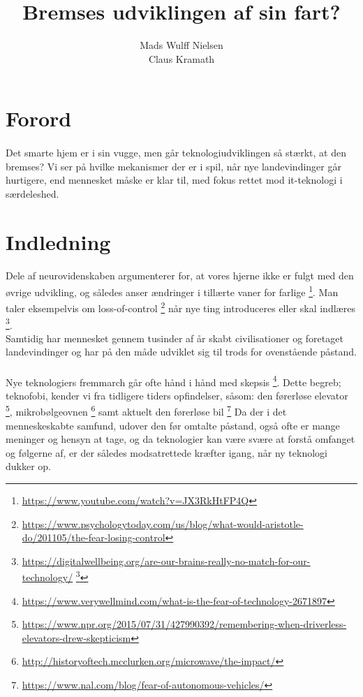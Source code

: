 \documentclass{article}
\title{%
Bremses udviklingen af sin fart?
}
\author{Mads Wulff Nielsen \\
Claus Kramath}
\begin{document}
\maketitle
\thispagestyle{empty}
\newpage
\tableofcontents
\thispagestyle{empty} 
\newpage
\section{Forord}
\paragraph{}
Det smarte hjem er i sin vugge, men går teknologiudviklingen så
stærkt, at den bremses? Vi ser på hvilke mekanismer der er i spil, når nye
landevindinger går hurtigere, end mennesket måske er klar til, med fokus
rettet mod it-teknologi i særdeleshed.
\section{Indledning}
\paragraph{}
Dele af neurovidenskaben argumenterer for, at vores hjerne ikke er fulgt med den øvrige udvikling,
og således anser ændringer i tillærte vaner for farlige \footnote{\url{https://www.youtube.com/watch?v=JX3RkHtFP4Q}}. Man taler eksempelvis om loss-of-control 
\footnote{\url{https://www.psychologytoday.com/us/blog/what-would-aristotle-do/201105/the-fear-losing-control}} når nye ting introduceres eller skal indlæres \footnote{\url{https://digitalwellbeing.org/are-our-brains-really-no-match-for-our-technology/} \footnote{https://www.youtube.com/watch?v=JX3RkHtFP4Q}}. \\
Samtidig har mennesket gennem tusinder af år skabt civilisationer og foretaget landevindinger og har på den måde udviklet sig til trods for ovenstående påstand.
\paragraph{}
Nye teknologiers fremmarch går ofte hånd i hånd med skepsis \footnote{\url{https://www.verywellmind.com/what-is-the-fear-of-technology-2671897}}.
Dette begreb; teknofobi, kender vi fra tidligere tiders opfindelser, såsom: den førerløse elevator \footnote{\url{https://www.npr.org/2015/07/31/427990392/remembering-when-driverless-elevators-drew-skepticism}}, mikrobølgeovnen \footnote{\url{http://historyoftech.mcclurken.org/microwave/the-impact/}}
samt aktuelt den førerløse bil \footnote{\url{https://www.nal.com/blog/fear-of-autonomous-vehicles/}}
Da der i det menneskeskabte samfund, udover den før omtalte påstand, også ofte er mange meninger og hensyn at tage, og da teknologier kan være svære at forstå omfanget og følgerne af, er der således modsatrettede kræfter igang, når ny teknologi dukker op.
\end{document}
